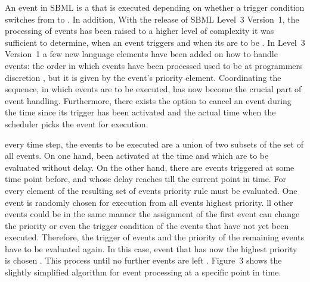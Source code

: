 \documentclass[10pt]{bmc_article}
\newenvironment{bmcformat}{\begin{raggedright}\baselineskip20pt\sloppy\setboolean{publ}{false}}{\end{raggedright}\baselineskip20pt\sloppy}
\begin{document}
\begin{bmcformat}
An event in \acs{SBML} is a  that is executed depending
on whether a trigger  condition switches from \false to \true.
In addition, 
With the release of \acs{SBML} Level~3 Version~1, the processing of events has
been raised to a higher level of complexity\COR{:}
 it was sufficient to determine, when an event triggers
and when its  are to be .
In Level~3 Version~1  a few new language elements have been
added on how to handle events:
 the order\COR{,} in which events have been processed\COR{,}
used to be at programmers discretion ,
but  it is given by the event's priority element.
Coordinating the sequence, in which events are to be executed, has now become
the crucial part of event handling. 
Furthermore, there exists the option to cancel an event during the time since
its trigger has been activated and the actual time when the scheduler picks the
event for execution.

 every time step, the events to be executed are a union of two
subsets of the set of all events.
On one hand,  been
activated at the  time and which are to be evaluated without delay.
On the other hand, there are events triggered at some time point
before, and whose delay reaches till the current point in time.
For every element of the resulting set of events 
priority rule must be evaluated.
One event is randomly chosen for execution from all events  highest
priority.
ll other events could be  in
the same manner
the assignment of the first event can change the priority or even the trigger
condition of the events that have not yet been executed.
Therefore, the trigger of  events and the priority of the
remaining events have to be evaluated again.
In this case,  event that has now the highest priority is
chosen .
This process  until no further events are left
.
Figure~3 shows the slightly simplified algorithm for event processing at a
specific point in time.


\end{bmcformat}
\end{document}
